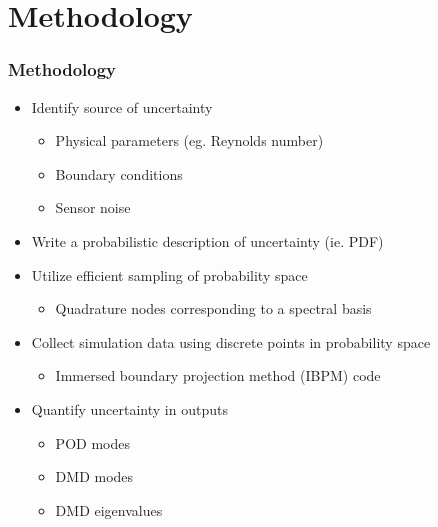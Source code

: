 \documentclass[9pt]{beamer}
\begin{document}
\section{Methodology}
\label{sec-2}
\begin{frame}
\frametitle{Methodology}
\label{sec-2-1}

\begin{itemize}
\item Identify source of uncertainty
\begin{itemize}
\item Physical parameters (eg. Reynolds number)
\item Boundary conditions
\item Sensor noise
\end{itemize}
\item Write a probabilistic description of uncertainty (ie. PDF)
\item Utilize efficient sampling of probability space
\begin{itemize}
\item Quadrature nodes corresponding to a spectral basis
\end{itemize}
\item Collect simulation data using discrete points in probability space
\begin{itemize}
\item Immersed boundary projection method (IBPM) code
\end{itemize}
\item Quantify uncertainty in outputs
\begin{itemize}
\item POD modes
\item DMD modes
\item DMD eigenvalues
\end{itemize}
\end{itemize}
\end{frame}
\end{document}
